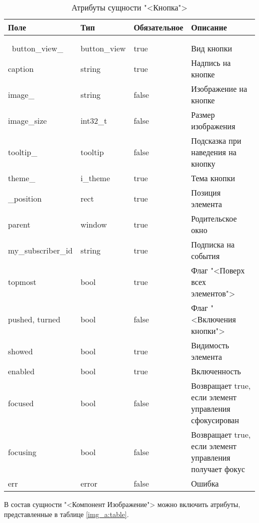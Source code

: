 \begin{xltabular}{\textwidth}{|l|l|p{1.7cm}|X|}
	\caption{Атрибуты сущности "<Кнопка">\label{button_a:table}}\\ \hline
	\centrow Поле & \centrow Тип & \centrow Обяза\-тельное & \centrow Описание \\ \hline
	 &  &  &  \\ \hline
	\endfirsthead
	 &  &  &  \\ \hline
	\finishhead
	\ button{\_}view{\_} & button{\_}view & true & Вид кнопки \\ \hline
	caption & string & true & Надпись на кнопке \\ \hline
	image{\_} & string & false & Изображение на кнопке \\ \hline
	image{\_}size & int32{\_}t & false & Размер изображения \\ \hline
	tooltip{\_} & tooltip & false & Подсказка при наведения на кнопку \\ \hline
	theme{\_}  & i{\_}theme & true & Тема кнопки \\ \hline
	{\_}position & rect & true & Позиция элемента \\ \hline
	parent & window & true & Родительское окно \\ \hline
	my{\_}subscriber{\_}id & string & true & Подписка на события \\ \hline
	topmost & bool & true & Флаг "<Поверх всех элементов"> \\ \hline 
	pushed, turned & bool & false & Флаг "<Включения кнопки"> \\ \hline 
	showed & bool & true & Видимость элемента \\ \hline 
	enabled & bool & true & Включенность \\ \hline 
	focused & bool & false & Возвращает true, если элемент управления сфокусирован \\ \hline 
	focusing & bool & false & Возвращает true, если элемент управления получает фокус \\ \hline
	err & error & false & Ошибка
\end{xltabular}

В состав сущности "<Компонент Изображение"> можно включить атрибуты, представленные в таблице \ref{img_a:table}.

